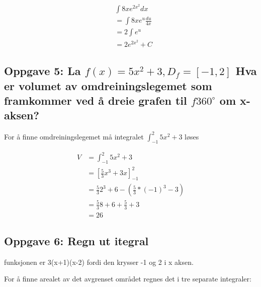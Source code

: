 \documentclass{article}
\begin{document}
\begin{align*}
    & \int 8xe^{2x^2}dx \\
    &= \int 8xe^{u} \frac{du}{4x} \\
    &= 2 \int e^{u} \\ 
    &= 2e^{2x^2} + C
\end{align*}

\subsection{Oppgave 5: La $f(x)=5x^2+3, D_f=[-1, 2]$ Hva er volumet av omdreiningslegemet som framkommer ved å dreie grafen til $f 360^\circ$ om x-aksen?}

For å finne omdreiningslegemet må integralet $\int_{-1}^{2} 5x^2+3$ løses

\begin{align*}
    V &= \int_{-1}^{2} 5x^2+3 \\
    &= [\frac{5}{3}x^3+3x]^{2}_{-1} \\
    &= \frac{5}{3}2^3+6-(\frac{5}{3}*(-1)^3-3) \\
    &= \frac{5}{3}8 + 6 + \frac{5}{3} + 3 \\
    &= 26
\end{align*}

\subsection{Oppgave 6: Regn ut itegral}

funksjonen er 3(x+1)(x-2) fordi den krysser -1 og 2 i x aksen.

For å finne arealet av det avgrenset området regnes det i tre separate integraler:
\end{document}
